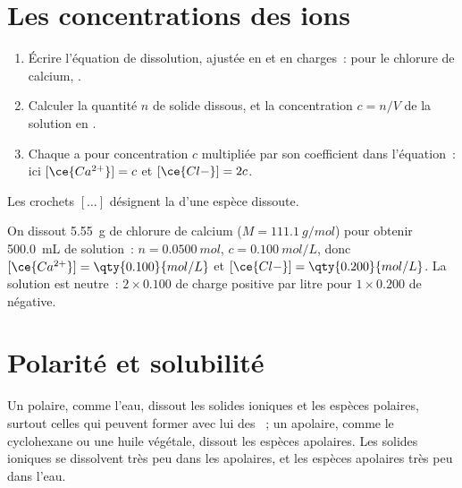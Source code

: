 \section{Les concentrations des ions}

\begin{method}\label{met:g11:dissolution:ions}
\begin{enumerate}
  \item Écrire l'équation de dissolution, ajustée en  et en
        charges~: pour le chlorure de calcium,
        .
  \item Calculer la quantité $n$ de solide dissous, et la concentration
        $c = n / V$ de la solution en .
  \item Chaque  a pour concentration $c$ multipliée par son
        coefficient dans l'équation~: ici $[\ce{Ca^{2+}}] = c$ et
        $[\ce{Cl-}] = 2c$.
\end{enumerate}
Les crochets $[\ldots]$ désignent la  d'une espèce
dissoute.
\end{method}

\begin{example}\label{ex:g11:dissolution:cacl2}
On dissout \qty{5.55}{g} de chlorure de calcium
($M = \qty{111.1}{g/mol}$) pour obtenir \qty{500.0}{mL} de solution~:
$n = \qty{0.0500}{mol}$, $c = \qty{0.100}{mol/L}$, donc
$[\ce{Ca^{2+}}] = \qty{0.100}{mol/L}$ et
$[\ce{Cl-}] = \qty{0.200}{mol/L}$. La solution est neutre~: $2 \times
0.100$ de charge positive par litre pour $1 \times 0.200$ de négative.
\end{example}

\section{Polarité et solubilité}

\begin{proposition}\label{prop:g11:dissolution:like}
Un  polaire, comme l'eau, dissout les solides ioniques et les
espèces polaires, surtout celles qui peuvent former avec lui des
~; un  apolaire, comme le cyclohexane ou une
huile végétale, dissout les espèces apolaires. Les solides ioniques se
dissolvent très peu dans les  apolaires, et les espèces
apolaires très peu dans l'eau.
\end{proposition}

